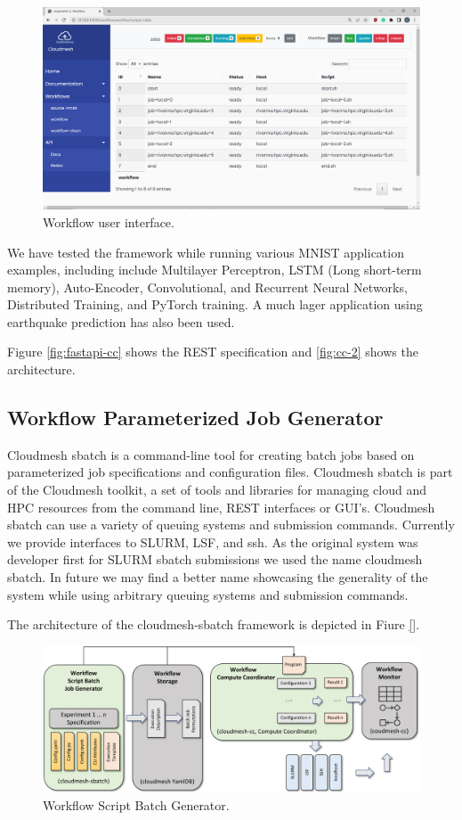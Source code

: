 \documentclass[utf8]{FrontiersinVancouver} %
\begin{document}
\begin{figure}[htb]
    \centering
    \includegraphics[width=0.70\columnwidth]{images/cc-1.png}
    \caption{Workflow user interface. }
    \label{fig:cc-3}
\end{figure}


We have tested the framework while running various MNIST application
examples, including include Multilayer Perceptron, LSTM (Long
short-term memory), Auto-Encoder, Convolutional, and Recurrent Neural
Networks, Distributed Training, and PyTorch training.  A much lager
application using earthquake prediction has also been used.

Figure \ref{fig:fastapi-cc} shows the REST specification and
\ref{fig:cc-2} shows the architecture.

\subsection{Workflow Parameterized Job Generator}
\label{sec:workflow-sbatch}


Cloudmesh sbatch is a command-line tool for creating batch jobs based
on parameterized job specifications and configuration files.
Cloudmesh sbatch is part of the Cloudmesh toolkit, a set of tools and
libraries for managing cloud and HPC resources from the command line,
REST interfaces or GUI's. Cloudmesh sbatch can use a variety of
queuing systems and submission commands. Currently we provide
interfaces to SLURM, LSF, and ssh. As the original system was
developer first for SLURM sbatch submissions we used the name
cloudmesh sbatch. In future we may find a better name showcasing the
generality of the system while using arbitrary queuing systems and
submission commands.

The architecture of the cloudmesh-sbatch framework is depicted in Fiure \ref{}.

\begin{figure}[htb]
    \centering
    \includegraphics[width=0.70\columnwidth]{images/cloudmesh-sbatch-new.pdf}
    \caption{Workflow Script Batch Generator.}
    \label{fig:cm-sbatch}
\end{figure}
\end{document}

